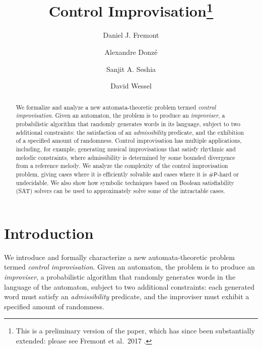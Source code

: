 \documentclass[a4paper,USenglish,numberwithinsect]{lipics}
\theoremstyle{plain}
\theoremstyle{definition}
\newcommand{\sharpP}{\ensuremath{\mathsf{\# P}}}
\begin{document}
\title{Control Improvisation\footnote{This is a preliminary version of the paper, which has since been substantially extended: please see Fremont et al.~2017 \cite{jacm-preprint}.}}
\author{Daniel J. Fremont}
\author{Alexandre Donz\'e}
\author{Sanjit A. Seshia}
\author{David Wessel}

\maketitle

\begin{abstract} 
We formalize and analyze a new automata-theoretic
problem termed {\em control improvisation}. Given an automaton, the
problem is to produce an \emph{improviser}, a probabilistic algorithm
that randomly generates words in its language, subject to two
additional constraints: the satisfaction of an \emph{admissibility}
predicate, and the exhibition of a specified amount of
randomness. Control improvisation
has multiple applications, including, for example, 
generating musical improvisations
that satisfy rhythmic and melodic constraints, where admissibility is
determined by some bounded divergence from a reference melody. We
analyze the complexity of the control improvisation problem, giving
cases where it is efficiently solvable and cases where it is
\sharpP-hard or undecidable. We also show how symbolic techniques
based on Boolean satisfiability (SAT) solvers can be used to approximately solve some of the
intractable cases.
\end{abstract} 

\section{Introduction}
\label{sec:intro}

We introduce and formally characterize a new automata-theoretic problem termed {\em control
improvisation}. Given an automaton, the problem is to produce an \emph{improviser}, a probabilistic
algorithm that randomly generates words in the language of the automaton, subject to two additional
constraints: each generated word must satisfy an \emph{admissibility} predicate, and the improviser
must exhibit a specified amount of randomness.
\end{document}
